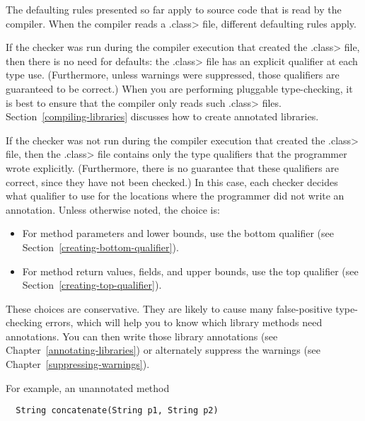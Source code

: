 The defaulting rules presented so far apply to source code that is read by
the compiler.  When the compiler reads a \<.class> file, different
defaulting rules apply.

If the checker was run during the compiler execution that created the
\<.class> file,
then there is no need for
defaults:  the \<.class> file has an explicit qualifier at each type use.
(Furthermore, unless warnings were suppressed, those qualifiers are
guaranteed to be correct.)
When you are performing pluggable type-checking,
it is best to ensure that the compiler only reads such \<.class> files.
Section~\ref{compiling-libraries} discusses how to create annotated
libraries.

If the checker was not run during the compiler execution that created the
\<.class> file, then the \<.class> file contains only the type qualifiers
that the programmer wrote explicitly.  (Furthermore, there is no guarantee
that these qualifiers are correct, since they have not been checked.)
In this case, each checker decides what qualifier to use for the
locations where the programmer did not write an annotation.  Unless otherwise noted, the
choice is:

\begin{itemize}
\item
  For method parameters and lower bounds, use the bottom qualifier (see
  Section~\ref{creating-bottom-qualifier}).
\item
  For method return values, fields, and upper bounds, use the top qualifier (see
  Section~\ref{creating-top-qualifier}).
\end{itemize}

These choices are conservative.  They are likely to cause many
false-positive type-checking errors, which will help you to know which
library methods need annotations.  You can then write those library
annotations (see Chapter~\ref{annotating-libraries}) or alternately
suppress the warnings (see Chapter~\ref{suppressing-warnings}).

For example, an unannotated method

\begin{Verbatim}
  String concatenate(String p1, String p2)
\end{Verbatim}

